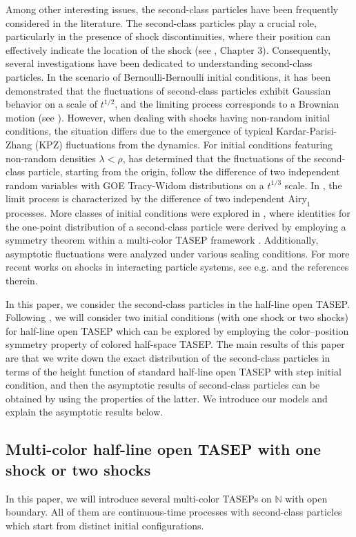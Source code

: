 \documentclass[12pt,a4paper]{amsart}
\theoremstyle{remark}
\numberwithin{equation}{section} \numberwithin{theorem}{section}
\begin{document}
Among other interesting issues, the second-class particles have been frequently considered in the literature. The second-class particles play a crucial role, particularly in the presence of shock discontinuities, where their position can effectively indicate the location of the shock (see \cite{Ligg99}, Chapter 3). Consequently, several investigations have been dedicated to understanding second-class particles. In the scenario of Bernoulli-Bernoulli initial conditions, it has been demonstrated that the fluctuations of second-class particles exhibit Gaussian behavior on a scale of $t^{1/2}$, and the limiting process corresponds to a Brownian motion (see \cite{Ferr92, FF94}). However, when dealing with shocks having non-random initial conditions, the situation differs due to the emergence of typical Kardar-Parisi-Zhang (KPZ) fluctuations from the dynamics. For initial conditions featuring non-random densities $\lambda < \rho$, \cite{FGN19} has determined that the fluctuations of the second-class particle, starting from the origin, follow the difference of two independent random variables with GOE Tracy-Widom distributions on a $t^{1/3}$ scale. In \cite{FN23}, the limit process is characterized by the difference of two independent $\mathrm{Airy}_1$ processes. More classes of initial conditions were explored in \cite{BF22}, where identities for the one-point distribution of a second-class particle were derived by employing a symmetry theorem within a multi-color TASEP framework \cite{BB21}. Additionally, asymptotic fluctuations were analyzed under various scaling conditions. For more recent works on shocks in interacting particle systems, see e.g. \cite{FN15,FN17,Nej18,FN20,Nej20} and the references therein.

In this paper, we consider the second-class particles in the half-line open TASEP. Following \cite{BF22}, we will consider two initial conditions (with one shock or two shocks) for half-line open TASEP which can be explored by employing the color--position symmetry property of colored half-space TASEP. The main results of this paper are that we write down the exact distribution of the second-class particles in terms of the height function of standard half-line open TASEP with step initial condition, and then the asymptotic results of second-class particles can be obtained by using the properties of the latter. We introduce our models and explain the asymptotic results below.

\subsection{Multi-color half-line open TASEP with one shock or two shocks}
\label{ssec:models}
In this paper, we will introduce several multi-color TASEPs on $\mathbb{N}$ with open boundary. All of them are continuous-time processes with second-class particles which start from distinct initial configurations.
\end{document}
